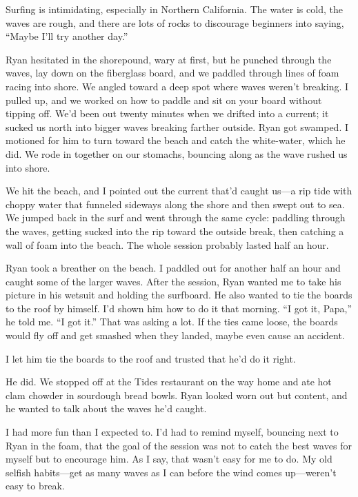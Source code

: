\documentclass[12pt]{book}
\begin{document}
Surfing is intimidating, especially in Northern California. The water is cold, the waves are rough, and there are lots of rocks to discourage beginners into saying, ``Maybe I'll try another day.''

Ryan hesitated in the shorepound, wary at first, but he punched through the waves, lay down on the fiberglass board, and we paddled through lines of foam racing into shore. We angled toward a deep spot where waves weren't breaking. I pulled up, and we worked on how to paddle and sit on your board without tipping off. We'd been out twenty minutes when we drifted into a current; it sucked us north into bigger waves breaking farther outside. Ryan got swamped. I motioned for him to turn toward the beach and catch the white-water, which he did. We rode in together on our stomachs, bouncing along as the wave rushed us into shore.

We hit the beach, and I pointed out the current that'd caught us---a rip tide with choppy water that funneled sideways along the shore and then swept out to sea. We jumped back in the surf and went through the same cycle: paddling through the waves, getting sucked into the rip toward the outside break, then catching a wall of foam into the beach. The whole session probably lasted half an hour.

Ryan took a breather on the beach. I paddled out for another half an hour and caught some of the larger waves. After the session, Ryan wanted me to take his picture in his wetsuit and holding the surfboard. He also wanted to tie the boards to the roof by himself. I'd shown him how to do it that morning. ``I got it, Papa,'' he told me. ``I got it.'' That was asking a lot. If the ties came loose, the boards would fly off and get smashed when they landed, maybe even cause an accident.

I let him tie the boards to the roof and trusted that he'd do it right.

He did. We stopped off at the Tides restaurant on the way home and ate hot clam chowder in sourdough bread bowls. Ryan looked worn out but content, and he wanted to talk about the waves he'd caught.

I had more fun than I expected to. I'd had to remind myself, bouncing next to Ryan in the foam, that the goal of the session was not to catch the best waves for myself but to encourage him. As I say, that wasn't easy for me to do. My old selfish habits---get as many waves as I can before the wind comes up---weren't easy to break.
\end{document}
